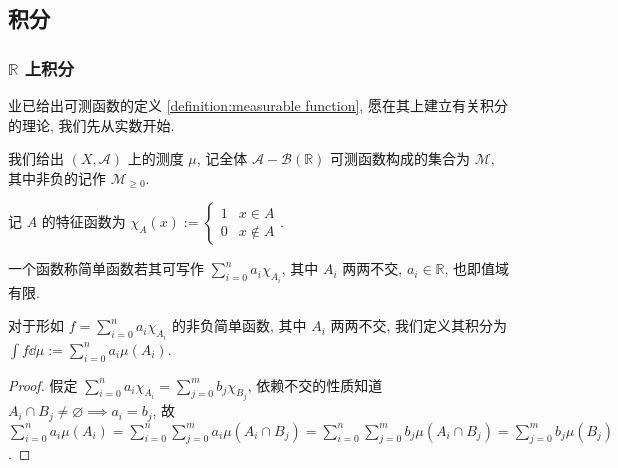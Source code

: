 \subsection{积分}

\subsubsection{\(\mathbb{R}\) 上积分}

业已给出可测函数的定义 \ref{definition:measurable function}, 愿在其上建立有关积分的理论, 我们先从实数开始.

\begin{remark}
    我们给出 \((X,\mathcal{A})\) 上的测度 \(\mu\), 记全体 \(\mathcal{A} - \mathcal{B} (\mathbb{R})\) 可测函数构成的集合为 \(\mathcal{M}\),
    其中非负的记作 \(\mathcal{M}_{\geq 0}\).
\end{remark}

\begin{remark}
    记 \(A\) 的特征函数为 \(\chi_A (x) := \begin{cases}
        1 & x \in A \\
        0 & x \notin A
    \end{cases}\).
\end{remark}

\begin{definition}
    一个函数称简单函数若其可写作 \(\sum_{i=0}^{n} a_i \chi_{A_i}\), 其中 \(A_i\) 两两不交, \(a_i \in \mathbb{R}\), 也即值域有限.
\end{definition}

\begin{definition}[积分]
    对于形如 \(f = \sum_{i=0}^{n} a_i \chi_{A_i}\) 的非负简单函数, 其中 \(A_i\) 两两不交, 我们定义其积分为 \(\int f \dd \mu := \sum_{i=0}^{n} a_i \mu(A_i)\).

    \begin{proof}
        假定 \(\sum_{i=0}^{n} a_i \chi_{A_i} = \sum_{j=0}^{m} b_j \chi_{B_j}\), 依赖不交的性质知道 \(A_i \cap B_j \neq \varnothing \implies a_i = b_j\),
        故 \(\sum_{i=0}^{n} a_i \mu(A_i) = \sum_{i=0}^{n} \sum_{j=0}^{m} a_i \mu(A_i \cap B_j) = \sum_{i=0}^{n} \sum_{j=0}^{m} b_j \mu(A_i \cap B_j) = \sum_{j=0}^{m} b_j \mu(B_j)\).
    \end{proof}
\end{definition}

